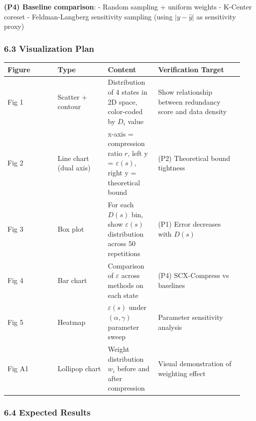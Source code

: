 \documentclass[
  12pt,
]{article}
\begin{document}
\textbf{(P4) Baseline comparison}: - Random sampling + uniform weights - K-Center coreset -
Feldman-Langberg sensitivity sampling (using \(|y - \hat{y}|\) as sensitivity proxy)

\subsubsection{6.3 Visualization Plan}\label{visualization-plan}

\begin{longtable}[]{@{}p{0.20\linewidth}p{0.20\linewidth}p{0.20\linewidth}p{0.34\linewidth}@{}}
\toprule\noalign{}
\begin{minipage}[b]{\linewidth}\raggedright
Figure
\end{minipage} & \begin{minipage}[b]{\linewidth}\raggedright
Type
\end{minipage} & \begin{minipage}[b]{\linewidth}\raggedright
Content
\end{minipage} & \begin{minipage}[b]{\linewidth}\raggedright
Verification Target
\end{minipage} \\
\midrule\noalign{}
\endhead
\bottomrule\noalign{}
\endlastfoot
Fig 1 & Scatter + contour & Distribution of 4 states in 2D space, color-coded by \(D_i\) value
& Show relationship between redundancy score and data density \\
Fig 2 & Line chart (dual axis) & x-axis = compression ratio \(r\), left y =
\(\varepsilon(s)\), right y = theoretical bound & (P2) Theoretical bound tightness \\
Fig 3 & Box plot & For each \(D(s)\) bin, show \(\varepsilon(s)\) distribution across 50 repetitions & (P1) Error decreases with \(D(s)\) \\
Fig 4 & Bar chart & Comparison of \(\varepsilon\) across methods on each state & (P4)
SCX-Compress vs baselines \\
Fig 5 & Heatmap & \(\varepsilon(s)\) under \((\alpha, \gamma)\) parameter sweep &
Parameter sensitivity analysis \\
Fig A1 & Lollipop chart & Weight distribution \(w_i\) before and after compression &
Visual demonstration of weighting effect \\
\end{longtable}

\subsubsection{6.4 Expected Results}\label{expected-results}
\end{document}

